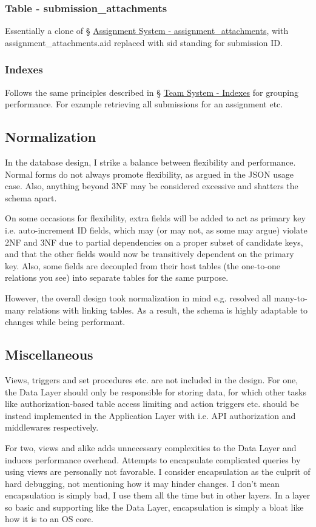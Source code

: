 \documentclass[12pt]{report}
\newcommand{\n}{\par}
\begin{document}
\subsubsection{Table - submission\_attachments} \label{data-layer.design.assignment-system.submission_attachments}
Essentially a clone of \S{} \hyperref[data-layer.design.assignment-system.assignment_attachments]{Assignment System - assignment\_attachments},
with assignment\_attach\-ments.aid replaced with sid standing for submission ID.

\subsubsection{Indexes} \label{data-layer.design.assignment-system.indexes}
Follows the same principles described in
\S{} \hyperref[data-layer.design.team-system.indexes]{Team System - Indexes}
for grouping performance.
For example retrieving all submissions for an assignment etc.


\subsection{Normalization} \label{data-layer.design.normalization}
In the database design, I strike a balance between flexibility and performance.
Normal forms do not always promote flexibility, as argued in the JSON usage case.
Also, anything beyond 3NF may be considered excessive and shatters the schema apart.\n
On some occasions for flexibility, extra fields will be added to act as primary key i.e. auto-increment ID fields,
which may (or may not, as some may argue) violate 2NF and 3NF due to partial dependencies on a proper subset of candidate keys,
and that the other fields would now be transitively dependent on the primary key.
Also, some fields are decoupled from their host tables (the one-to-one relations you see) into separate tables for the same purpose.\n
However, the overall design took normalization in mind e.g. resolved all many-to-many relations with linking tables.
As a result, the schema is highly adaptable to changes while being performant.


\subsection{Miscellaneous} \label{data-layer.design.miscellaneous}
Views, triggers and set procedures etc. are not included in the design.
For one, the Data Layer should only be responsible for storing data,
for which other tasks like authorization-based table access limiting and
action triggers etc. should be instead implemented in the Application Layer
with i.e. API authorization and middlewares respectively.\n
For two, views and alike adds unnecessary complexities to the Data Layer and
induces performance overhead.
Attempts to encapsulate complicated queries by using views are personally not favorable.
I consider encapsulation as the culprit of hard debugging, not mentioning how it may hinder changes.
I don't mean encapsulation is simply bad, I use them all the time but in other layers.
In a layer so basic and supporting like the Data Layer, encapsulation is simply a bloat like how it is to an OS core.
\end{document}
